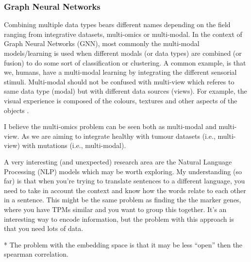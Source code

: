 
\subsubsection{Graph Neural Networks}

Combining multiple data types bears different names depending on the field ranging from integrative datasets, multi-omics or multi-modal. In the context of Graph Neural Networks (GNN), most commonly the multi-modal models/learning is used when different modals (or data types) are combined (or fusion) to do some sort of classification or clustering. A common example, is that we, humans, have a multi-modal learning by integrating the different sensorial stimuli. Multi-modal should not be confused with multi-view which referes to same data type (modal) but with different data sources (views). For example, the visual experience is composed of the colours, textures and other aspects of the objects \cite{Eman_Alshari_undated-vv}.

I believe the multi-omics problem can be seen both as multi-modal and multi-view. As we are aiming to integrate healthy with tumour datasets (i.e., multi-view) with mutations (i.e., multi-modal).

A very interesting (and unexpected) research area are the Natural Language Processing (NLP) models which may be worth exploring. My understanding (so far) is that when you're trying to translate sentences to a different language, you need to take in account the context and know how the words relate to each other in a sentence. This might be the same problem as finding the the marker genes, where you have TPMs similar and you want to group this together. It's an interesting way to encode information, but the problem with this approach is that you need lots of data.

* The problem with the embedding space is that it may be less “open” then the spearman correlation.